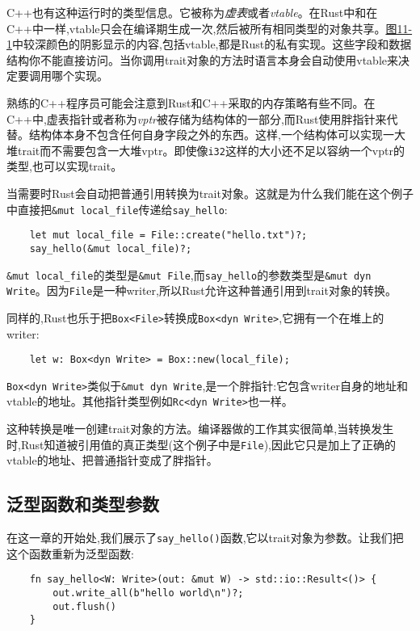 C++也有这种运行时的类型信息。它被称为\emph{虚表}或者\emph{vtable}。在Rust中和在C++中一样,vtable只会在编译期生成一次,然后被所有相同类型的对象共享。\hyperref[f11-1]{图11-1}中较深颜色的阴影显示的内容,包括vtable,都是Rust的私有实现。这些字段和数据结构你不能直接访问。当你调用trait对象的方法时语言本身会自动使用vtable来决定要调用哪个实现。

熟练的C++程序员可能会注意到Rust和C++采取的内存策略有些不同。在C++中,虚表指针或者称为\emph{vptr}被存储为结构体的一部分,而Rust使用胖指针来代替。结构体本身不包含任何自身字段之外的东西。这样,一个结构体可以实现一大堆trait而不需要包含一大堆vptr。即使像\texttt{i32}这样的大小还不足以容纳一个vptr的类型,也可以实现trait。

当需要时Rust会自动把普通引用转换为trait对象。这就是为什么我们能在这个例子中直接把\texttt{\&mut local\_file}传递给\texttt{say\_hello}:
\begin{verbatim}
    let mut local_file = File::create("hello.txt")?;
    say_hello(&mut local_file)?;
\end{verbatim}

\texttt{\&mut local\_file}的类型是\texttt{\&mut File},而\texttt{say\_hello}的参数类型是\texttt{\&mut dyn Write}。因为\texttt{File}是一种writer,所以Rust允许这种普通引用到trait对象的转换。

同样的,Rust也乐于把\texttt{Box<File>}转换成\texttt{Box<dyn Write>},它拥有一个在堆上的writer:
\begin{verbatim}
    let w: Box<dyn Write> = Box::new(local_file);
\end{verbatim}

\texttt{Box<dyn Write>}类似于\texttt{\&mut dyn Write},是一个胖指针:它包含writer自身的地址和vtable的地址。其他指针类型例如\texttt{Rc<dyn Write>}也一样。

这种转换是唯一创建trait对象的方法。编译器做的工作其实很简单,当转换发生时,Rust知道被引用值的真正类型(这个例子中是\texttt{File}),因此它只是加上了正确的vtable的地址、把普通指针变成了胖指针。

\subsection{泛型函数和类型参数}
在这一章的开始处,我们展示了\texttt{say\_hello()}函数,它以trait对象为参数。让我们把这个函数重新为泛型函数:
\begin{verbatim}
    fn say_hello<W: Write>(out: &mut W) -> std::io::Result<()> {
        out.write_all(b"hello world\n")?;
        out.flush()
    }
\end{verbatim}


